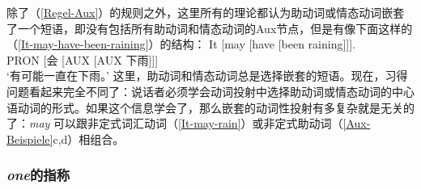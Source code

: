 除了（\ref{Regel-Aux}）的规则之外，这里所有的理论都认为助动词或情态动词嵌套了一个短语，即没有包括所有助动词和情态动词的Aux节点，但是有像下面这样的（\ref{It-may-have-been-raining}）的结构：
\ea
\gll It [may [have [been raining]]].\\
PRON [会 [AUX [AUX 下雨]]]\\
\glt `有可能一直在下雨。'
\z
这里，助动词和情态动词总是选择嵌套的短语。现在，习得问题看起来完全不同了：说话者必须学会动词投射中选择助动词或情态动词的中心语动词的形式。如果这个信息学会了，那么嵌套的动词性投射有多复杂就是无关的了：\emph{may} 可以跟非定式词汇动词（\ref{It-may-rain}）或非定式助动词（\ref{Aux-Beispiele}c,d）相组合。

\subsubsection{\emph{one}的指称}

